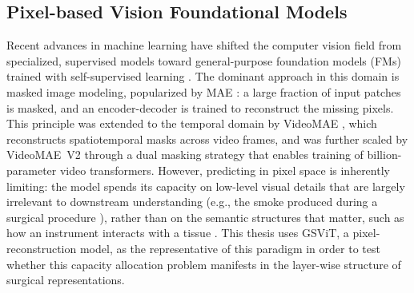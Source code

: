 \documentclass[11pt, a4paper]{article}
\begin{document}
\subsection{Pixel-based Vision Foundational Models}
Recent advances in machine learning have shifted the computer vision field from specialized, supervised models toward general-purpose foundation models (FMs) trained with self-supervised learning \parencite{new-era-in-vision-2025}. The dominant approach in this domain is masked image modeling, popularized by MAE \parencite{he-2021}: a large fraction of input patches is masked, and an encoder-decoder is trained to reconstruct the missing pixels. This principle was extended to the temporal domain by VideoMAE \parencite{tong-2022}, which reconstructs spatiotemporal masks across video frames, and was further scaled by VideoMAE~V2 \parencite{wang-2023} through a dual masking strategy that enables training of billion-parameter video transformers. However, predicting in pixel space is inherently limiting: the model spends its capacity on low-level visual details that are largely irrelevant to downstream understanding (e.g., the smoke produced during a surgical procedure \parencite{Zhang2022A}), rather than on the semantic structures that matter, such as how an instrument interacts with a tissue \parencite{wu-2026}. This thesis uses GSViT, a pixel-reconstruction model, as the representative of this paradigm in order to test whether this capacity allocation problem manifests in the layer-wise structure of surgical representations.
\end{document}
